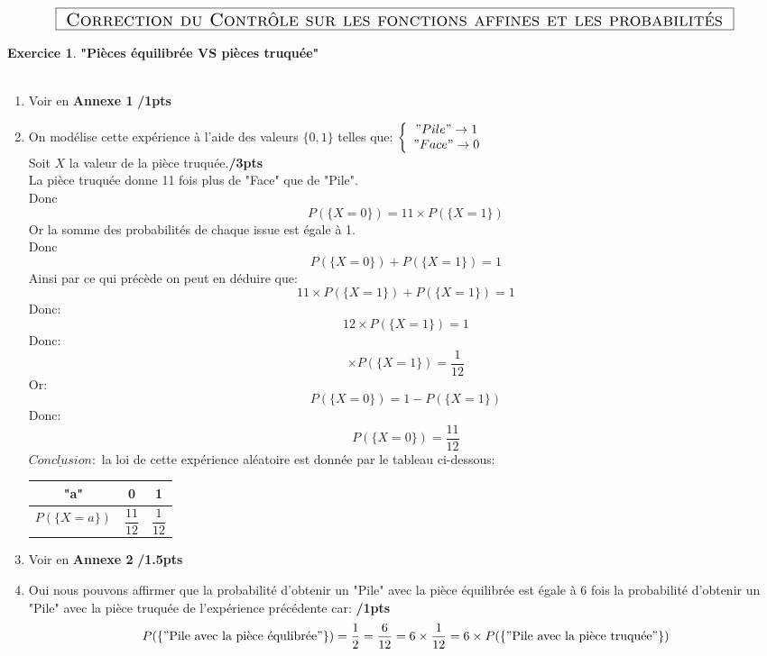 \documentclass[a4paper,11pt]{article}
\theoremstyle{definition}
\newtheorem{exo}{Exercice}
\begin{document}
\chead{}\renewcommand{\headrulewidth}{0.4pt}\renewcommand{\footrulewidth}{0.4pt}

\hfill\\[-0.7cm]
$$	\fbox{\text{\Large{ \sc Correction du Contrôle sur les fonctions affines et les probabilités }}}$$


\flushleft\normalsize



\begin{exo} \textbf{"Pièces équilibrée VS pièces truquée"}\\\hfil\\

	\begin{enumerate}%
		\item Voir en \textbf{Annexe 1}  \hfill\textbf{/1pts}
		\item On modélise cette expérience à l'aide des valeurs $\{0,1\}$ telles que: $\left\{\begin{array}{c}
		"Pile" \rightarrow 1\\
		"Face" \rightarrow 0
		\end{array}\right.$ \\
		 Soit $X$ la valeur de la pièce truquée.\hfill\textbf{/3pts}\\
		La pièce truquée donne 11 fois plus de "Face" que de "Pile".\\
		Donc $$P(\{X=0\}) = 11 \times P(\{X=1\})$$
		Or la somme des probabilités de chaque issue est égale à 1.\\
		Donc $$P(\{X=0\}) + P(\{X=1\}) = 1$$
		Ainsi par ce qui précède on peut en déduire que:
		$$11 \times P(\{X=1\}) + P(\{X=1\}) = 1$$
		Donc: 	$$12 \times P(\{X=1\})= 1$$
		Donc: $$\times P(\{X=1\})= \dfrac{1}{12}$$
		Or: $$P(\{X=0\}) = 1 - P(\{X=1\})$$
		Donc: $$P(\{X=0\}) = \dfrac{11}{12}$$
		$\underline{Conclusion}:$ la loi de cette expérience aléatoire est donnée par le tableau ci-dessous:
\begin{center}
			\begin{tabular}{|c|c|c|}
			\hline
			\text{Issue} "a" & 0 & 1\\
			\hline
			$P(\{X=a\})$ & $\dfrac{11}{12}$ & $\dfrac{1}{12}$\\
			\hline
		\end{tabular}
\end{center}

		\item  Voir en \textbf{Annexe 2}  \hfill\textbf{/1.5pts}\\[0.3cm]
		\item Oui nous pouvons affirmer que la probabilité d'obtenir un "Pile" avec la pièce équilibrée est égale à 6 fois la probabilité d'obtenir un "Pile" avec la pièce truquée de l'expérience précédente car: \hfill\textbf{/1pts}\\
		$$ P(\{"\text{Pile avec la pièce équlibrée}"\}) = \dfrac{1}{2} = \dfrac{6}{12} = 6 \times \dfrac{1}{12} = 6\times P(\{"\text{Pile avec la pièce truquée}"\})$$
	\end{enumerate}
\end{exo}
\end{document}
